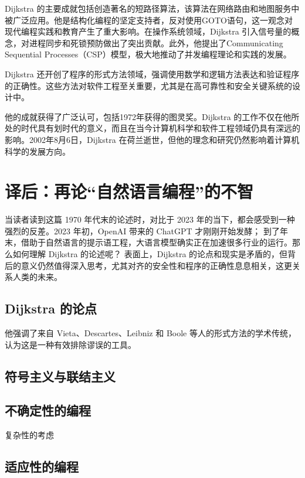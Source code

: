 \documentclass[a4paper,12pt]{article}
\begin{document}
Dijkstra 的主要成就包括创造著名的短路径算法，该算法在网络路由和地图服务中被广泛应用。他是结构化编程的坚定支持者，反对使用GOTO语句，这一观念对现代编程实践和教育产生了重大影响。在操作系统领域，Dijkstra 引入信号量的概念，对进程同步和死锁预防做出了突出贡献。此外，他提出了Communicating Sequential Processes（CSP）模型，极大地推动了并发编程理论和实践的发展。

Dijkstra 还开创了程序的形式方法领域，强调使用数学和逻辑方法表达和验证程序的正确性。这些方法对软件工程至关重要，尤其是在高可靠性和安全关键系统的设计中。

他的成就获得了广泛认可，包括1972年获得的图灵奖。Dijkstra 的工作不仅在他所处的时代具有划时代的意义，而且在当今计算机科学和软件工程领域仍具有深远的影响。2002年8月6日，Dijkstra 在荷兰逝世，但他的理念和研究仍然影响着计算机科学的发展方向。

\newpage

\section{译后：再论“自然语言编程”的不智}

当读者读到这篇 1970 年代末的论述时，对比于 2023 年的当下，都会感受到一种强烈的反差。2023 年初，OpenAI 带来的 ChatGPT 才刚刚开始发酵；
到了年末，借助于自然语言的提示语工程，大语言模型确实正在加速很多行业的运行。那么如何理解 Dijkstra 的论述呢？
表面上，Dijkstra 的论点和现实是矛盾的，但背后的意义仍然值得深入思考，尤其对齐的安全性和程序的正确性息息相关，这更关系人类的未来。

\subsection{Dijkstra 的论点}

他强调了来自 Vieta、Descartes、Leibniz 和 Boole 等人的形式方法的学术传统，认为这是一种有效排除谬误的工具。

\subsection{符号主义与联结主义}

\subsection{不确定性的编程}

复杂性的考虑

\subsection{适应性的编程}
\end{document}
